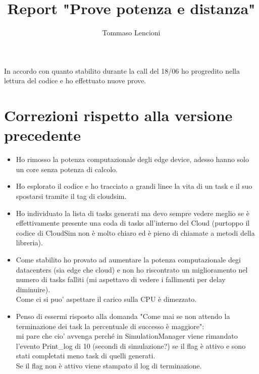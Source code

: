 \documentclass[12pt, a4paper]{report} %
\title{Report "Prove potenza e distanza"}
\author{Tommaso Lencioni}
\begin{document}
\maketitle
In accordo con quanto stabilito durante la call del 18/06 ho progredito nella lettura del codice e ho effettuato nuove prove.\\
\section*{Correzioni rispetto alla versione precedente}
 \begin{itemize}
 	\item Ho rimosso la potenza computazionale degli edge device, adesso hanno solo un core senza potenza di calcolo.
 	\item Ho esplorato il codice e ho tracciato a grandi linee la vita di un task e il suo spostarsi tramite il tag di cloudsim.
 	\item Ho individuato la lista di tasks generati ma devo sempre vedere meglio se è effettivamente presente una coda di tasks all'interno del Cloud (purtoppo il codice di CloudSim non è molto chiaro ed è pieno di chiamate a metodi della libreria).
 	\item Come stabilito ho provato ad aumentare la potenza computazionale degi datacenters (sia edge che cloud) e non ho riscontrato un miglioramento nel numero di tasks falliti (mi aspettavo di vedere i fallimenti per delay diminuire).\\
 	Come ci si puo' aspettare il carico sulla CPU è dimezzato.
 	\item Penso di essermi risposto alla domanda "Come mai se non attendo la terminazione dei task la percentuale di successo è maggiore":\\
 	mi pare che cio' avvenga perché in SimulationManager viene rimandato l'evento Print\_log di 10 (secondi di simulazione?) se il flag è attivo e sono stati completati meno task di quelli generati.\\
Se il flag non è attivo viene stampato il log di terminazione.
 	\end{itemize}
\end{document}
